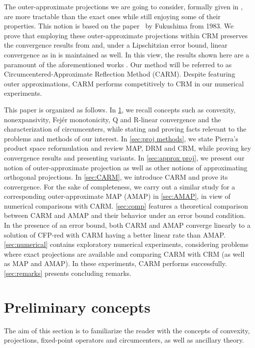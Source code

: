 \documentclass[smallextended,numbook,nospthms]{svjour3}
\theoremstyle{plain}
\theoremstyle{definition}
\begin{document}
The outer-approximate projections we are going to consider, formally given in , are more tractable than the exact ones while still enjoying some of their properties. This notion is based on the paper~\cite{Fukushima:1983} by Fukushima from 1983.  We prove that employing these outer-approximate projections within CRM preserves the convergence results from \cite{Behling:2020} and, under a Lipschitzian error bound, linear convergence as in \cite{Arefidamghani:2020} is maintained as well. In this view, the results shown here are a paramount of the aforementioned works \cite{Behling:2020, Arefidamghani:2020}. Our method will be referred to as Circumcentered-Approximate Reflection Method (CARM). Despite featuring outer approximations,  CARM performs competitively to CRM in our numerical experiments. 

This paper is organized as follows. In \cref{sec:prelim}, we recall concepts such as convexity, nonexpansivity, Fejér monotonicity, Q and R-linear convergence and the characterization of circumcenters, while stating and proving facts relevant to the problems and methods of our interest. In \cref{sec:proj methods}, we state Pierra's product space reformulation and review MAP, DRM and CRM, while proving key convergence results and presenting variants. In \cref{sec:approx proj}, we present our notion of outer-approximate projection as well as other notions of approximating orthogonal projections. In \cref{sec:CARM}, we introduce CARM and prove its convergence. For the sake of completeness, we carry out a similar study for a corresponding outer-approximate MAP (AMAP) in \cref{sec:AMAP}, in view of numerical comparisons with CARM. \cref{sec:comp} features a theoretical comparison between CARM and AMAP and their behavior under an error bound condition. In the presence of an error bound, both CARM and AMAP converge linearly to a solution of CFP-red with CARM having a better linear rate than AMAP. \cref{sec:numerical} contains exploratory numerical experiments, considering problems where exact projections are available and comparing CARM with CRM (as well as MAP and AMAP). In these experiments, CARM performs successfully. \cref{sec:remarks} presents concluding remarks.

\newpage
\section{Preliminary concepts}\label{sec:prelim}
The aim of this section is to familiarize the reader with the concepts of convexity, projections, fixed-point operators and circumcenters, as well as ancillary theory.     
\end{document}
